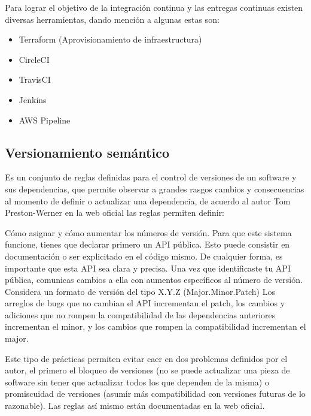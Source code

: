 Para lograr el objetivo de la integración continua y las entregas continuas existen diversas herramientas, dando mención a algunas estas son:

\begin{itemize}
    \item Terraform (Aprovisionamiento de infraestructura)
    \item CircleCI
    \item TravisCI
    \item Jenkins
    \item AWS Pipeline
\end{itemize}

\subsection{Versionamiento semántico}

Es un conjunto de reglas definidas para el control de versiones de un software y sus dependencias, que permite observar a grandes rasgos cambios y consecuencias al momento de definir o actualizar una dependencia, de acuerdo al autor Tom Preston-Werner en la web oficial \cite{semver} las reglas permiten definir:

Cómo asignar y cómo aumentar los números de versión. Para que este sistema funcione, tienes que declarar primero un API pública. Esto puede consistir en documentación o ser explicitado en el código mismo. De cualquier forma, es importante que esta API sea clara y precisa. Una vez que identificaste tu API pública, comunicas cambios a ella con aumentos específicos al número de versión. Considera un formato de versión del tipo X.Y.Z (Major.Minor.Patch) Los arreglos de bugs que no cambian el API incrementan el patch, los cambios y adiciones que no rompen la compatibilidad de las dependencias anteriores incrementan el minor, y los cambios que rompen la compatibilidad incrementan el major.

Este tipo de prácticas permiten evitar caer en dos problemas definidos por el autor, el primero el bloqueo de versiones (no se puede actualizar una pieza de software sin tener que actualizar todos los que dependen de la misma) o promiscuidad de versiones (asumir más compatibilidad con versiones futuras de lo razonable). Las reglas así mismo están documentadas en la web oficial.